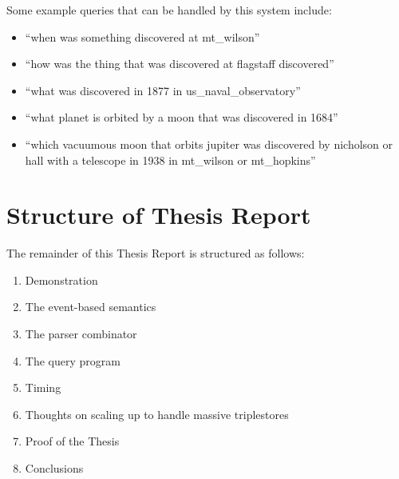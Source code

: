 \documentclass[../main.tex]{subfiles}
\begin{document}
Some example queries that can be handled by this system include:

\begin{itemize}
	\item ``when was something discovered at mt\_wilson''
	\item ``how was the thing that was discovered at flagstaff discovered''
	\item ``what was discovered in 1877 in us\_naval\_observatory''
	\item ``what planet is orbited by a moon that was discovered in 1684''
	\item ``which vacuumous moon that orbits jupiter was discovered by nicholson or hall with a telescope in 1938 in mt\_wilson or mt\_hopkins''
\end{itemize}

\section{Structure of Thesis Report}

The remainder of this Thesis Report is structured as follows:

\begin{enumerate}
	\item Demonstration
	\item The event-based semantics
	\item The parser combinator
	\item The query program
	\item Timing
	\item Thoughts on scaling up to handle massive triplestores
	\item Proof of the Thesis
	\item Conclusions
\end{enumerate}
\end{document}
